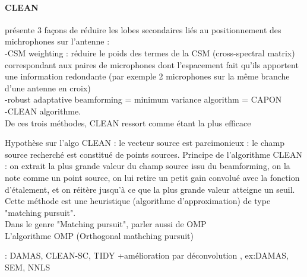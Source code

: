 \paragraph{CLEAN}


\cite{Dougherty1998} présente 3 façons de réduire les lobes secondaires liés au positionnement des michrophones sur l'antenne : \\
-CSM weighting : réduire le poids des termes de la CSM (cross-spectral matrix) correspondant aux paires de microphones dont l'espacement fait qu'ils apportent une information redondante (par exemple 2 microphones sur la même branche d'une antenne en croix)\\
-robust adaptative beamforming = minimum variance algorithm = CAPON\\
-CLEAN algorithme.\\
De ces trois méthodes, CLEAN ressort comme étant la plus efficace

Hypothèse sur l'algo CLEAN : le vecteur source est parcimonieux : le champ source recherché est constitué de points sources. Principe de l'algorithme CLEAN \citep{Hogbom1974} : on extrait la plus grande valeur du champ source issu du beamforming, on la note comme un point source, on lui retire un petit gain convolué avec la fonction d'étalement, et on réitère jusqu'à ce que la plus grande valeur atteigne un seuil.\\

Cette méthode est une heuristique (algorithme d'approximation) de type "matching pursuit".\\

Dans le genre "Matching pursuit", parler aussi de OMP\\
L'algorithme OMP (Orthogonal mathching pursuit)





  : DAMAS, CLEAN-SC, TIDY
+amélioration par déconvolution , ex:DAMAS, SEM, NNLS







